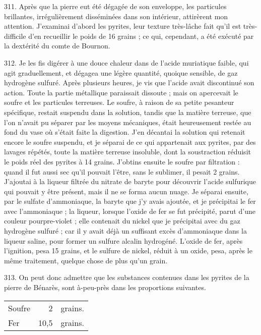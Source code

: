 \documentclass[a4paper, 11pt, oneside, polutonikogreek, french]{article}
\begin{document}
311. Après que la pierre eut été dégagée de son enveloppe, les particules brillantes, irrégulièrement disséminées dans son intérieur, attirèrent mon attention. J'examinai d'abord les pyrites, leur texture très-lâche fait qu'il est très-difficile d'en recueillir le poids de 16 grains ; ce qui, cependant, a été exécuté par la dextérité du comte de Bournon.

312. Je les fis digérer à une douce chaleur dans de l'acide muriatique faible, qui agit graduellement, et dégagea une légère quantité, quoique sensible, de gaz hydrogène sulfuré. Après plusieurs heures, je vis que l'acide avait discontinué son action. Toute la partie métallique paraissait dissoute ; mais on apercevait le soufre et les particules terreuses. Le soufre, à raison de sa petite pesanteur spécifique, restait suspendu dans la solution, tandis que la matière terreuse, que l'on n'avait pu séparer par les moyens mécaniques, était heureusement restée au fond du vase où s'était faite la digestion. J'en décantai la solution qui retenait encore le soufre suspendu, et je séparai de ce qui appartenait aux pyrites, par des lavages répétés, toute la matière terreuse insoluble, dont la soustraction réduisit le poids réel des pyrites à 14 grains. J'obtins ensuite le soufre par filtration : quand il fut aussi sec qu'il pouvait l'être, sans le sublimer, il pesait 2 grains. J'ajoutai à la liqueur filtrée du nitrate de baryte pour découvrir l'acide sulfurique qui pouvait y être présent, mais il ne se forma aucun nuage. Je séparai ensuite, par le sulfate d'ammoniaque, la baryte que j'y avais ajoutée, et je précipitai le fer avec l'ammoniaque ; la liqueur, lorsque l'oxide de fer se fut précipité, parut d'une couleur pourpre-violet ; elle contenait du nickel que je précipitai avec du gaz hydrogène sulfuré ; car il y avait déjà un suffisant excès d'ammoniaque dans la liqueur saline, pour former un sulfure alcalin hydrogéné. L'oxide de fer, après l'ignition, pesa 15 grains, et le sulfure de nickel, réduit à un oxide, pesa, après le même traitement, quelque chose de plus qu'un grain.

313. On peut donc admettre que les substances contenues dans les pyrites de la pierre de Bénarès, sont à-peu-près dans les proportions suivantes.

\begin{table}[!ht]
    \centering
    \begin{tabular}{l r l}
        Soufre & 2 & grains. \\
        Fer & 10,5 & grains. \\
    \end{tabular}
\end{table}
\end{document}
